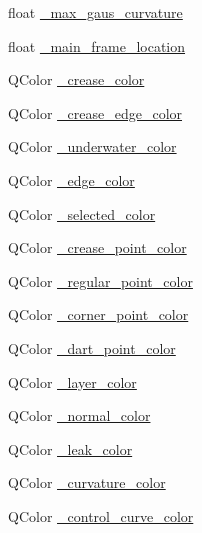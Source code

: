 \begin{DoxyCompactItemize}
\item 
float \hyperlink{classShipCAD_1_1SubdivisionSurface_a1658374385131656d359ff373d2cb08c}{\+\_\+max\+\_\+gaus\+\_\+curvature}
\item 
float \hyperlink{classShipCAD_1_1SubdivisionSurface_a3ea08aa45ad221a1b485010ce5e8dee7}{\+\_\+main\+\_\+frame\+\_\+location}
\item 
Q\+Color \hyperlink{classShipCAD_1_1SubdivisionSurface_aaa3b772931e04f8650db2d005ae05d6a}{\+\_\+crease\+\_\+color}
\item 
Q\+Color \hyperlink{classShipCAD_1_1SubdivisionSurface_a6106aee9d086aa377d9a3a6a6291b54c}{\+\_\+crease\+\_\+edge\+\_\+color}
\item 
Q\+Color \hyperlink{classShipCAD_1_1SubdivisionSurface_a8a64eabb53fa0facaa6e59579305328b}{\+\_\+underwater\+\_\+color}
\item 
Q\+Color \hyperlink{classShipCAD_1_1SubdivisionSurface_aced3b075062f92e55b3a89729cad3fd2}{\+\_\+edge\+\_\+color}
\item 
Q\+Color \hyperlink{classShipCAD_1_1SubdivisionSurface_a3cfcbbe769216c753330f71e57a4cf4d}{\+\_\+selected\+\_\+color}
\item 
Q\+Color \hyperlink{classShipCAD_1_1SubdivisionSurface_a9602182d9a123dc267d34a2cd1b45ed7}{\+\_\+crease\+\_\+point\+\_\+color}
\item 
Q\+Color \hyperlink{classShipCAD_1_1SubdivisionSurface_afee1585e376c34aa9b3be47f3a174cdb}{\+\_\+regular\+\_\+point\+\_\+color}
\item 
Q\+Color \hyperlink{classShipCAD_1_1SubdivisionSurface_aba9fae36ed19b802707c748396c1fd63}{\+\_\+corner\+\_\+point\+\_\+color}
\item 
Q\+Color \hyperlink{classShipCAD_1_1SubdivisionSurface_a45054fd2d0065a342828bcd675e91307}{\+\_\+dart\+\_\+point\+\_\+color}
\item 
Q\+Color \hyperlink{classShipCAD_1_1SubdivisionSurface_a0833012e177dfd6cdb71174cb7baed17}{\+\_\+layer\+\_\+color}
\item 
Q\+Color \hyperlink{classShipCAD_1_1SubdivisionSurface_a62cbe24451a794c0da3660ed0f1066ca}{\+\_\+normal\+\_\+color}
\item 
Q\+Color \hyperlink{classShipCAD_1_1SubdivisionSurface_aacd1616b97a4425cc9b1051e01785596}{\+\_\+leak\+\_\+color}
\item 
Q\+Color \hyperlink{classShipCAD_1_1SubdivisionSurface_a05a83d21996abb065abe7f3109f35a73}{\+\_\+curvature\+\_\+color}
\item 
Q\+Color \hyperlink{classShipCAD_1_1SubdivisionSurface_af0385bc183e805c1adc23750747a43d7}{\+\_\+control\+\_\+curve\+\_\+color}

\end{DoxyCompactItemize}
